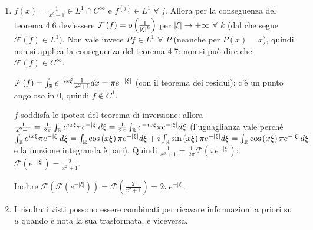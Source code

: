 \documentclass{article}
\begin{document}
\begin{enumerate}
\item $f\left( x\right) =\frac{1}{x^{2}+1}\in L^{1}\cap C^{\infty }$ e $%
f^{\left( j\right) }\in L^{1}$ $\forall $ $j$. Allora per la conseguenza del
teorema 4.6 dev'essere $\mathcal{F}\left( f\right) =o\left( \frac{1}{%
\left\vert \xi \right\vert ^{k}}\right) $ per $\left\vert \xi \right\vert
\rightarrow +\infty $ $\forall $ $k$ (dal che segue $\mathcal{F}\left(
f\right) \in L^{1}$). Non vale invece $Pf\in L^{1}$ $\forall $ $P$ (neanche
per $P\left( x\right) =x$), quindi non si applica la conseguenza del teorema
4.7: non si pu\`{o} dire che $\mathcal{F}\left( f\right) \in C^{\infty }$.

$\mathcal{F}\left( f\right) =\int_{%
\mathbb{R}
}e^{-ix\xi }\frac{1}{x^{2}+1}dx=\pi e^{-\left\vert \xi \right\vert }$ (con
il teorema dei residui): c'\`{e} un punto angoloso in $0$, quindi $f\not\in
C^{1}$.

$f$ soddisfa le ipotesi del teorema di inversione: allora $\frac{1}{x^{2}+1}=%
\frac{1}{2\pi }\int_{%
\mathbb{R}
}e^{ix\xi }\pi e^{-\left\vert \xi \right\vert }d\xi =\frac{1}{2\pi }\int_{%
\mathbb{R}
}e^{-ix\xi }\pi e^{-\left\vert \xi \right\vert }d\xi $ (l'uguaglianza vale
perch\'{e} $\int_{%
\mathbb{R}
}e^{ix\xi }\pi e^{-\left\vert \xi \right\vert }d\xi =\int_{%
\mathbb{R}
}\cos \left( x\xi \right) \pi e^{-\left\vert \xi \right\vert }d\xi +i\int_{%
\mathbb{R}
}\sin \left( x\xi \right) \pi e^{-\left\vert \xi \right\vert }d\xi =\int_{%
\mathbb{R}
}\cos \left( x\xi \right) \pi e^{-\left\vert \xi \right\vert }d\xi $ e la
funzione integranda \`{e} pari). Quindi $\frac{1}{x^{2}+1}=\frac{1}{2\pi }%
\mathcal{F}\left( \pi e^{-\left\vert \xi \right\vert }\right) $: $\mathcal{F}%
\left( e^{-\left\vert \xi \right\vert }\right) =\frac{2}{x^{2}+1}$.

Inoltre $\mathcal{F}\left( \mathcal{F}\left( e^{-\left\vert \xi \right\vert
}\right) \right) =\mathcal{F}\left( \frac{2}{x^{2}+1}\right) =2\pi
e^{-\left\vert \xi \right\vert }$.

\item I risultati visti possono essere combinati per ricavare informazioni a
priori su $u$ quando \`{e} nota la sua trasformata, e viceversa.


\end{enumerate}
\end{document}
